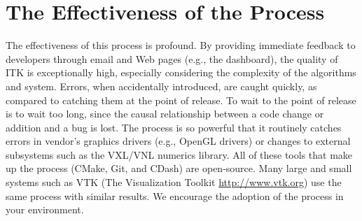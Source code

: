 \section{The Effectiveness of the Process}
\label{sec:Effectiveness}

The effectiveness of this process is profound. By providing immediate
feedback to developers through email and Web pages (e.g., the dashboard), the
quality of ITK is exceptionally high, especially considering the complexity
of the algorithms and system. Errors, when accidentally introduced, are caught
quickly, as compared to catching them at the point of release. To wait to the
point of release is to wait too long, since the causal relationship between a
code change or addition and a bug is lost. The process is so powerful that it
routinely catches errors in vendor's graphics drivers (e.g., OpenGL drivers)
or changes to external subsystems such as the VXL/VNL numerics library. All
of these tools that make up the process (CMake, Git, and CDash) are
open-source. Many large and small systems such as VTK (The Visualization
Toolkit \url{http://www.vtk.org}) use the same process with similar
results. We encourage the adoption of the process in your environment.

